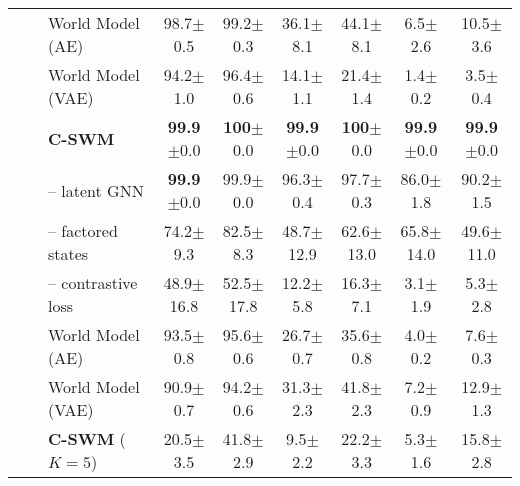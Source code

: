 \documentclass{article} %
\begin{document}
\begin{table}[ht]
\begin{adjustbox}{center,width=0.9\linewidth}
\begin{tabular}{lllcccccc}
\\
&&World Model (AE) & 98.7{\color{lightgrey}\tiny$\pm$0.5}  & 99.2{\color{lightgrey}\tiny$\pm$0.3} & 36.1{\color{lightgrey}\tiny$\pm$8.1}  & 44.1{\color{lightgrey}\tiny$\pm$8.1} & 6.5{\color{lightgrey}\tiny$\pm$2.6}  & 10.5{\color{lightgrey}\tiny$\pm$3.6}\\
&&World Model (VAE) & 94.2{\color{lightgrey}\tiny$\pm$1.0}  & 96.4{\color{lightgrey}\tiny$\pm$0.6} & 14.1{\color{lightgrey}\tiny$\pm$1.1}  & 21.4{\color{lightgrey}\tiny$\pm$1.4} & 1.4{\color{lightgrey}\tiny$\pm$0.2}  & 3.5{\color{lightgrey}\tiny$\pm$0.4}\\
\midrule
\multicolumn{2}{c}{\parbox[t]{2mm}{}} &\bf C-SWM& {\bf99.9}{\color{lightgrey}\tiny$\pm$0.0} & {\bf100}{\color{lightgrey}\tiny$\pm$0.0} & {\bf99.9}{\color{lightgrey}\tiny$\pm$0.0} & {\bf100}{\color{lightgrey}\tiny$\pm$0.0} & {\bf99.9}{\color{lightgrey}\tiny$\pm$0.0} & {\bf99.9}{\color{lightgrey}\tiny$\pm$0.0} \\
&&-- latent GNN & {\bf99.9}{\color{lightgrey}\tiny$\pm$0.0} & 99.9{\color{lightgrey}\tiny$\pm$0.0} & 96.3{\color{lightgrey}\tiny$\pm$0.4} & 97.7{\color{lightgrey}\tiny$\pm$0.3} & 86.0{\color{lightgrey}\tiny$\pm$1.8} & 90.2{\color{lightgrey}\tiny$\pm$1.5}\\
&&-- factored states & 74.2{\color{lightgrey}\tiny$\pm$9.3} & 82.5{\color{lightgrey}\tiny$\pm$8.3} & 48.7{\color{lightgrey}\tiny$\pm$12.9} & 62.6{\color{lightgrey}\tiny$\pm$13.0} & 65.8{\color{lightgrey}\tiny$\pm$14.0} & 49.6{\color{lightgrey}\tiny$\pm$11.0} \\
&&-- contrastive loss & 48.9{\color{lightgrey}\tiny$\pm$16.8} & 52.5{\color{lightgrey}\tiny$\pm$17.8} & 12.2{\color{lightgrey}\tiny$\pm$5.8} & 16.3{\color{lightgrey}\tiny$\pm$7.1} & 3.1{\color{lightgrey}\tiny$\pm$1.9} & 5.3{\color{lightgrey}\tiny$\pm$2.8}\\
&&World Model (AE) & 93.5{\color{lightgrey}\tiny$\pm$0.8}  & 95.6{\color{lightgrey}\tiny$\pm$0.6} & 26.7{\color{lightgrey}\tiny$\pm$0.7}  & 35.6{\color{lightgrey}\tiny$\pm$0.8} & 4.0{\color{lightgrey}\tiny$\pm$0.2}  & 7.6{\color{lightgrey}\tiny$\pm$0.3}\\
&&World Model (VAE) & 90.9{\color{lightgrey}\tiny$\pm$0.7}  & 94.2{\color{lightgrey}\tiny$\pm$0.6} & 31.3{\color{lightgrey}\tiny$\pm$2.3}  & 41.8{\color{lightgrey}\tiny$\pm$2.3} & 7.2{\color{lightgrey}\tiny$\pm$0.9}  & 12.9{\color{lightgrey}\tiny$\pm$1.3}\\
\midrule
\parbox[t]{0.1mm}{} & \parbox[t]{2mm}{}&{\bf C-SWM} ($K=5$)& 20.5{\color{lightgrey}\tiny$\pm$3.5}  & 41.8{\color{lightgrey}\tiny$\pm$2.9} & 9.5{\color{lightgrey}\tiny$\pm$2.2}  & 22.2{\color{lightgrey}\tiny$\pm$3.3} & 5.3{\color{lightgrey}\tiny$\pm$1.6}  & 15.8{\color{lightgrey}\tiny$\pm$2.8}\\

\end{tabular}
\end{adjustbox}
\end{table}
\end{document}

